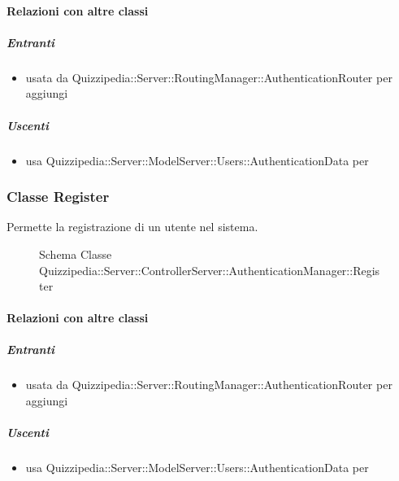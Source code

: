 \paragraph{Relazioni con altre classi}
\subparagraph{Entranti}
\begin{itemize}
\item usata da Quizzipedia::Server::RoutingManager::AuthenticationRouter per aggiungi
\end{itemize}
\subparagraph{Uscenti}
\begin{itemize}
\item usa Quizzipedia::Server::ModelServer::Users::AuthenticationData per 
\end{itemize}
\subsubsection{Classe Register}
Permette la registrazione di un utente nel sistema.
\begin{figure}[H]
\centering
\noindent{}
\caption[Schema Classe Register]{Schema Classe Quizzipedia::Server::ControllerServer::AuthenticationManager::Register}
\end{figure}
\paragraph{Relazioni con altre classi}
\subparagraph{Entranti}
\begin{itemize}
\item usata da Quizzipedia::Server::RoutingManager::AuthenticationRouter per aggiungi
\end{itemize}
\subparagraph{Uscenti}
\begin{itemize}
\item usa Quizzipedia::Server::ModelServer::Users::AuthenticationData per 
\end{itemize}
